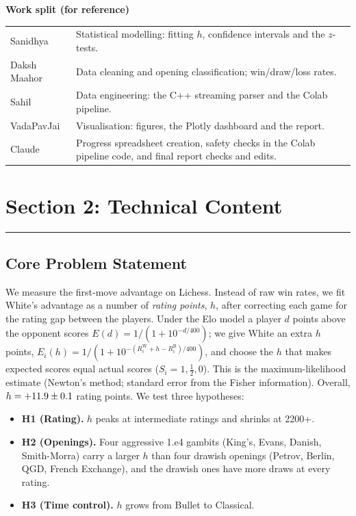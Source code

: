 \documentclass[11pt,a4paper]{article}
\begin{document}
\vspace{8pt}
\textbf{Work split (for reference)}

\begin{tabularx}{\linewidth}{@{}>{\raggedright\arraybackslash}p{2.8cm}X@{}}
Sanidhya & Statistical modelling: fitting $h$, confidence intervals and the $z$-tests. \\
Daksh Maahor & Data cleaning and opening classification; win/draw/loss rates. \\
Sahil & Data engineering: the C++ streaming parser and the Colab pipeline. \\
VadaPavJai & Visualisation: figures, the Plotly dashboard and the report. \\
Claude & Progress spreadsheet creation, safety checks in the Colab pipeline code, and final report checks and edits. \\
\end{tabularx}

\newpage


\section*{Section 2: Technical Content}
\hrule
\subsection*{Core Problem Statement}
We measure the first-move advantage on Lichess. Instead of raw win rates, we fit White's
advantage as a number of \emph{rating points}, $h$, after correcting each game for the rating
gap between the players. Under the Elo model a player $d$ points above the opponent scores
$E(d)=1/(1+10^{-d/400})$; we give White an extra $h$ points,
$E_i(h)=1/(1+10^{-(R^{\mathrm W}_i+h-R^{\mathrm B}_i)/400})$, and choose the $h$ that makes
expected scores equal actual scores ($S_i=1,\tfrac12,0$). This is the maximum-likelihood
estimate (Newton's method; standard error from the Fisher information). Overall,
$h = +11.9 \pm 0.1$ rating points. We test three hypotheses:
\begin{itemize}
\item \textbf{H1 (Rating).} $h$ peaks at intermediate ratings and shrinks at 2200+.
\item \textbf{H2 (Openings).} Four aggressive 1.e4 gambits (King's, Evans, Danish, Smith-Morra)
  carry a larger $h$ than four drawish openings (Petrov, Berlin, QGD, French Exchange), and the
  drawish ones have more draws at every rating.
\item \textbf{H3 (Time control).} $h$ grows from Bullet to Classical.
\end{itemize}
\end{document}
